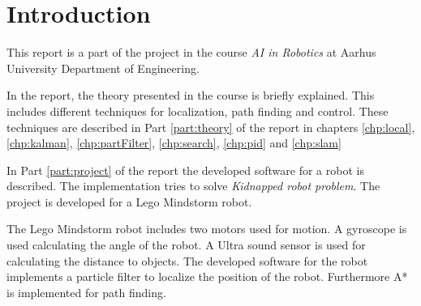 \chapter{Introduction}
\label{chp:intro}

This report is a part of the project in the course \emph{AI in Robotics} at Aarhus University Department of Engineering.

In the report, the theory presented in the course is briefly explained. This includes different techniques for localization, path finding and control. These techniques are described in Part \ref{part:theory} of the report in chapters \ref{chp:local}, \ref{chp:kalman}, \ref{chp:partFilter}, \ref{chp:search}, \ref{chp:pid} and \ref{chp:slam}

In Part \ref{part:project} of the report the developed software for a robot is described. The implementation tries to solve \emph{Kidnapped robot problem}. The project is developed for a Lego Mindstorm robot.

The Lego Mindstorm robot includes two motors used for motion. A gyroscope is used calculating the angle of the robot. A Ultra sound sensor is used for calculating the distance to objects. The developed software for the robot implements a particle filter to localize the position of the robot. Furthermore A* is implemented for path finding.